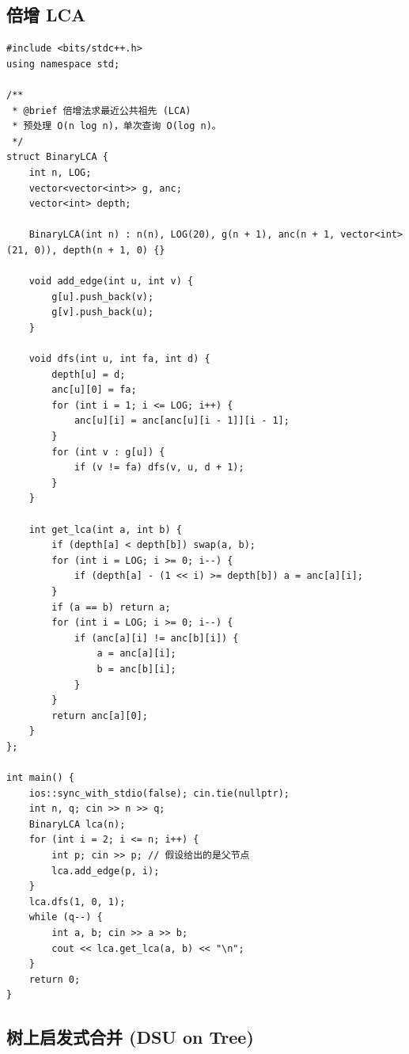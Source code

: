 \subsection{倍增 LCA}

\begin{lstlisting}
#include <bits/stdc++.h>
using namespace std;

/**
 * @brief 倍增法求最近公共祖先 (LCA)
 * 预处理 O(n log n)，单次查询 O(log n)。
 */
struct BinaryLCA {
    int n, LOG;
    vector<vector<int>> g, anc;
    vector<int> depth;

    BinaryLCA(int n) : n(n), LOG(20), g(n + 1), anc(n + 1, vector<int>(21, 0)), depth(n + 1, 0) {}

    void add_edge(int u, int v) {
        g[u].push_back(v);
        g[v].push_back(u);
    }

    void dfs(int u, int fa, int d) {
        depth[u] = d;
        anc[u][0] = fa;
        for (int i = 1; i <= LOG; i++) {
            anc[u][i] = anc[anc[u][i - 1]][i - 1];
        }
        for (int v : g[u]) {
            if (v != fa) dfs(v, u, d + 1);
        }
    }

    int get_lca(int a, int b) {
        if (depth[a] < depth[b]) swap(a, b);
        for (int i = LOG; i >= 0; i--) {
            if (depth[a] - (1 << i) >= depth[b]) a = anc[a][i];
        }
        if (a == b) return a;
        for (int i = LOG; i >= 0; i--) {
            if (anc[a][i] != anc[b][i]) {
                a = anc[a][i];
                b = anc[b][i];
            }
        }
        return anc[a][0];
    }
};

int main() {
    ios::sync_with_stdio(false); cin.tie(nullptr);
    int n, q; cin >> n >> q;
    BinaryLCA lca(n);
    for (int i = 2; i <= n; i++) {
        int p; cin >> p; // 假设给出的是父节点
        lca.add_edge(p, i);
    }
    lca.dfs(1, 0, 1);
    while (q--) {
        int a, b; cin >> a >> b;
        cout << lca.get_lca(a, b) << "\n";
    }
    return 0;
}
\end{lstlisting}

\subsection{树上启发式合并 (DSU on Tree)}

